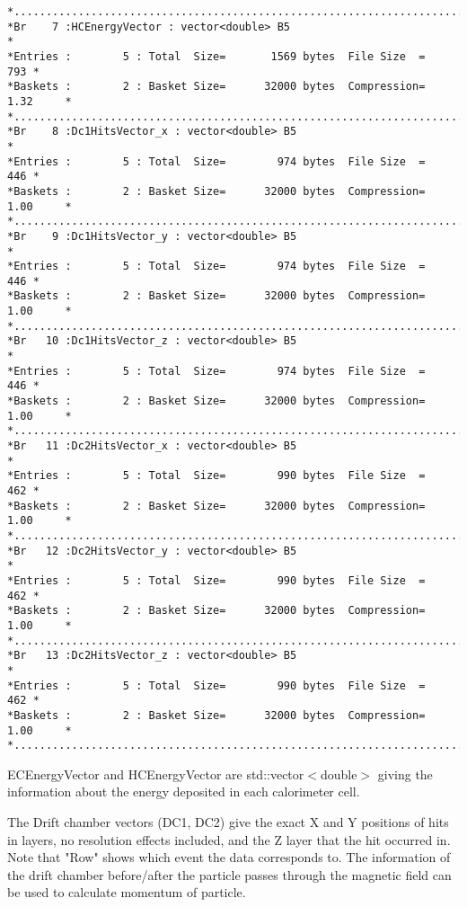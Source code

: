\documentclass[a4paper,11pt,twoside]{article}
\begin{document}
\begin{lstlisting}
*............................................................................*
*Br    7 :HCEnergyVector : vector<double> B5                                 *
*Entries :        5 : Total  Size=       1569 bytes  File Size  =        793 *
*Baskets :        2 : Basket Size=      32000 bytes  Compression=   1.32     *
*............................................................................*
*Br    8 :Dc1HitsVector_x : vector<double> B5                                *
*Entries :        5 : Total  Size=        974 bytes  File Size  =        446 *
*Baskets :        2 : Basket Size=      32000 bytes  Compression=   1.00     *
*............................................................................*
*Br    9 :Dc1HitsVector_y : vector<double> B5                                *
*Entries :        5 : Total  Size=        974 bytes  File Size  =        446 *
*Baskets :        2 : Basket Size=      32000 bytes  Compression=   1.00     *
*............................................................................*
*Br   10 :Dc1HitsVector_z : vector<double> B5                                *
*Entries :        5 : Total  Size=        974 bytes  File Size  =        446 *
*Baskets :        2 : Basket Size=      32000 bytes  Compression=   1.00     *
*............................................................................*
*Br   11 :Dc2HitsVector_x : vector<double> B5                                *
*Entries :        5 : Total  Size=        990 bytes  File Size  =        462 *
*Baskets :        2 : Basket Size=      32000 bytes  Compression=   1.00     *
*............................................................................*
*Br   12 :Dc2HitsVector_y : vector<double> B5                                *
*Entries :        5 : Total  Size=        990 bytes  File Size  =        462 *
*Baskets :        2 : Basket Size=      32000 bytes  Compression=   1.00     *
*............................................................................*
*Br   13 :Dc2HitsVector_z : vector<double> B5                                *
*Entries :        5 : Total  Size=        990 bytes  File Size  =        462 *
*Baskets :        2 : Basket Size=      32000 bytes  Compression=   1.00     *
*............................................................................*
\end{lstlisting}
ECEnergyVector and HCEnergyVector are std::vector$<$double$>$ giving the information about the energy deposited in each calorimeter cell.

The Drift chamber vectors (DC1, DC2) give the exact X and Y positions of hits in layers, no resolution effects included, and the Z layer that the hit occurred in.
Note that "Row" shows which event the data corresponds to.
The information of the drift chamber before/after the particle passes through the magnetic field can be used to calculate momentum of particle.
\end{document}
